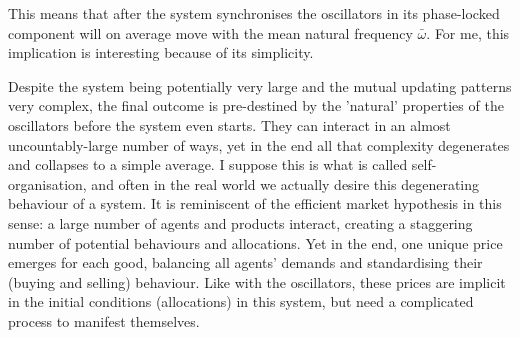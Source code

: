 \documentclass[11pt,a4paper]{article}
\newcommand{\graph}{\medskip\noindent}
\begin{document}
\graph
This means that after the system synchronises the oscillators in its phase-locked component will on average move with the mean natural frequency $\bar{\omega}$. 
For me, this implication is interesting because of its simplicity. 

Despite the system being potentially very large and the mutual updating patterns very complex, the final outcome is pre-destined by the 'natural' properties of the oscillators before the system even starts. 
They can interact in an almost uncountably-large number of ways, yet in the end all that complexity degenerates and collapses to a simple average. 
I suppose this is what is called self-organisation, and often in the real world we actually desire this degenerating behaviour of a system. 
It is reminiscent of the efficient market hypothesis in this sense: a large number of agents and products interact, creating a staggering number of potential behaviours and allocations. 
Yet in the end, one unique price emerges for each good, balancing all agents' demands and standardising their (buying and selling) behaviour. 
Like with the oscillators, these prices are implicit in the initial conditions (allocations) in this system, but need a complicated process to manifest themselves. 









\end{document}
